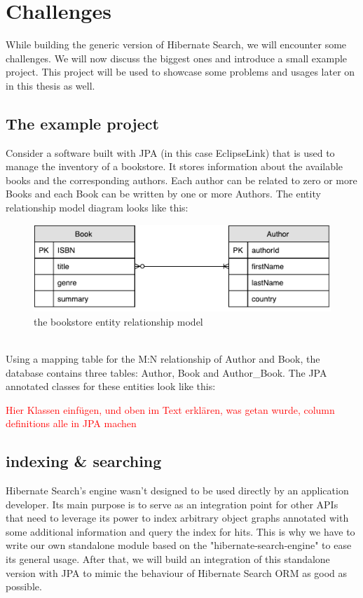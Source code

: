 \section{Challenges}\label{Challenges}
While building the generic version of Hibernate Search, we will encounter some challenges. We will now discuss the biggest ones and introduce a small example project. This project will be used to showcase some problems and usages later on in this thesis as well.

\subsection{The example project}
Consider a software built with JPA (in this case EclipseLink) that is used to manage the inventory of a bookstore. It stores information about the available books and the corresponding authors. Each author can be related to zero or more Books and each Book can be written by one or more Authors. The entity relationship model diagram looks like this:
\\
\begin{figure}[ht]
	\centering
	\includegraphics[scale = 0.9]{images/Sample_Project_ER.pdf}
	\caption{the bookstore entity relationship model}
	\label{fig3}
\end{figure}
\\
Using a mapping table for the M:N relationship of Author and Book, the database contains three tables: Author, Book and Author\_Book. The JPA annotated classes for these entities look like this:

\textcolor{red}{Hier Klassen einfügen, und oben im Text erklären, was getan wurde, column definitions alle in JPA machen}

\subsection{indexing \& searching}
Hibernate Search's engine wasn't designed to be used directly by an application developer. Its main purpose is to serve as an integration point for other APIs that need to leverage its power to index arbitrary object graphs annotated with some additional information and query the index for hits. This is why we have to write our own standalone module based on the "hibernate-search-engine" to ease its general usage. After that, we will build an integration of this standalone version with JPA to mimic the behaviour of Hibernate Search ORM as good as possible.

